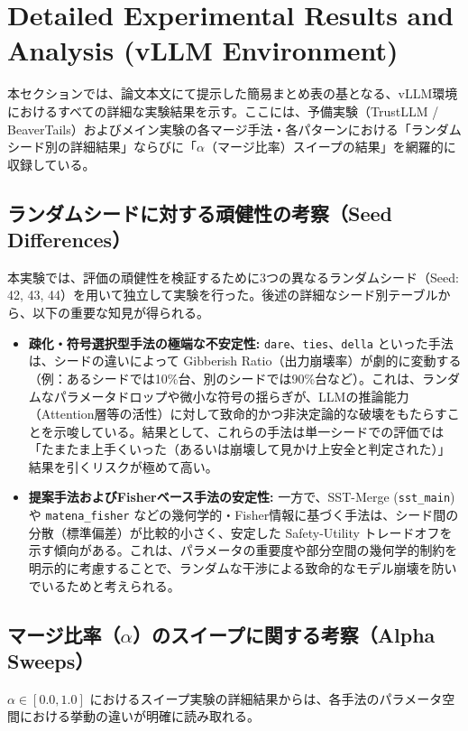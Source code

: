 \FloatBarrier
\section{Detailed Experimental Results and Analysis (vLLM Environment)}
\label{sec:appendix_detailed_results}

本セクションでは、論文本文にて提示した簡易まとめ表の基となる、vLLM環境におけるすべての詳細な実験結果を示す。ここには、予備実験（TrustLLM / BeaverTails）およびメイン実験の各マージ手法・各パターンにおける「ランダムシード別の詳細結果」ならびに「$\alpha$（マージ比率）スイープの結果」を網羅的に収録している。

\subsection{ランダムシードに対する頑健性の考察（Seed Differences）}
本実験では、評価の頑健性を検証するために3つの異なるランダムシード（Seed: 42, 43, 44）を用いて独立して実験を行った。後述の詳細なシード別テーブルから、以下の重要な知見が得られる。

\begin{itemize}
    \item \textbf{疎化・符号選択型手法の極端な不安定性:} \texttt{dare}、\texttt{ties}、\texttt{della} といった手法は、シードの違いによって Gibberish Ratio（出力崩壊率）が劇的に変動する（例：あるシードでは10\%台、別のシードでは90\%台など）。これは、ランダムなパラメータドロップや微小な符号の揺らぎが、LLMの推論能力（Attention層等の活性）に対して致命的かつ非決定論的な破壊をもたらすことを示唆している。結果として、これらの手法は単一シードでの評価では「たまたま上手くいった（あるいは崩壊して見かけ上安全と判定された）」結果を引くリスクが極めて高い。
    \item \textbf{提案手法およびFisherベース手法の安定性:} 一方で、SST-Merge (\texttt{sst\_main}) や \texttt{matena\_fisher} などの幾何学的・Fisher情報に基づく手法は、シード間の分散（標準偏差）が比較的小さく、安定した Safety-Utility トレードオフを示す傾向がある。これは、パラメータの重要度や部分空間の幾何学的制約を明示的に考慮することで、ランダムな干渉による致命的なモデル崩壊を防いでいるためと考えられる。
\end{itemize}

\subsection{マージ比率（$\alpha$）のスイープに関する考察（Alpha Sweeps）}
$\alpha \in [0.0, 1.0]$ におけるスイープ実験の詳細結果からは、各手法のパラメータ空間における挙動の違いが明確に読み取れる。

